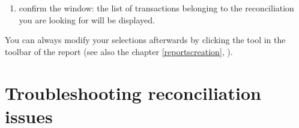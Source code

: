 \begin{enumerate}
\begin{itemize}
		\begin{itemize}
			\item in the  section, enter a name in the  field of the report;
			\item in the  section, tick  and then tick at least:
			\begin{itemize}
				\item {},
				\item {},
				\item {},
				\item {};
			\end{itemize}
		\end{itemize}	
	\end{itemize}
	\item confirm the window: the list of transactions belonging to the reconciliation you are looking for will be displayed.
\end{enumerate}

You can always modify your selections afterwards by clicking the  tool in the toolbar of the report (see also the chapter \vref{reportscreation}, ).


\section{Troubleshooting reconciliation issues\label{reconciliation-solve}}

